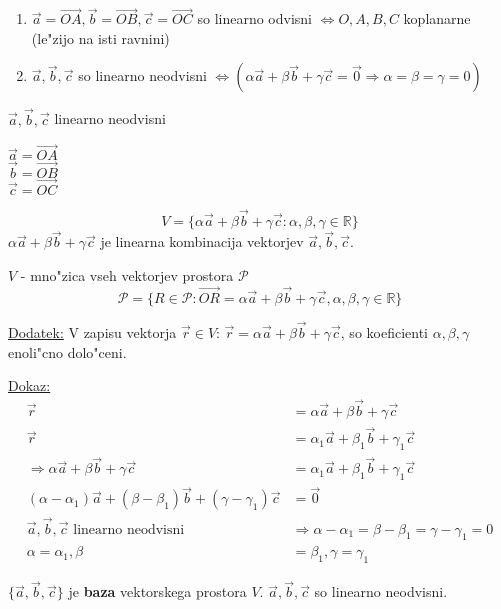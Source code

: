 \begin{enumerate}
	\item \(\vec{a} = \vec{OA}, \vec{b} = \vec{OB}, \vec{c} = \vec{OC}\) so linearno odvisni \(\Leftrightarrow O, A, B, C\) koplanarne (le"zijo na isti ravnini)
	\item \(\vec{a}, \vec{b}, \vec{c}\) so linearno neodvisni \(\Leftrightarrow (\alpha \vec{a} + \beta \vec{b} + \gamma \vec{c} = \vec{0} \Rightarrow \alpha = \beta = \gamma = 0)\)
\end{enumerate}

\(\vec{a}, \vec{b}, \vec{c}\) linearno neodvisni

\(\vec{a} = \vec{OA}\)\\
\(\vec{b} = \vec{OB}\)\\
\(\vec{c} = \vec{OC}\)

\[V = \{\alpha \vec{a} + \beta \vec{b} + \gamma \vec{c}: \alpha, \beta, \gamma \in \mathbb{R}\}\]
\(\alpha \vec{a} + \beta \vec{b} + \gamma \vec{c}\) je linearna kombinacija vektorjev \(\vec{a}, \vec{b}, \vec{c}\).

\(V\) - mno"zica vseh vektorjev prostora \(\mathcal{P}\)
\[\mathcal{P} = \{R \in \mathcal{P}: \vec{OR} = \alpha \vec{a} + \beta \vec{b} + \gamma \vec{c}, \alpha, \beta, \gamma \in \mathbb{R}\}\]

\underline{Dodatek:} V zapisu vektorja \(\vec{r} \in V\): \(\vec{r} = \alpha \vec{a} + \beta \vec{b} + \gamma \vec{c}\), so koeficienti \(\alpha, \beta, \gamma\) enoli"cno dolo"ceni.

\underline{Dokaz:}
\begin{align*}
	\vec{r} &= \alpha \vec{a} + \beta \vec{b} + \gamma \vec{c}\\
	\vec{r} &= \alpha_1 \vec{a} + \beta_1 \vec{b} + \gamma_1 \vec{c}\\
	\Rightarrow \alpha \vec{a} + \beta \vec{b} + \gamma \vec{c} &= \alpha_1 \vec{a} + \beta_1 \vec{b} + \gamma_1 \vec{c}\\
	(\alpha - \alpha_1)\vec{a} + (\beta - \beta_1)\vec{b} + (\gamma - \gamma_1)\vec{c} &= \vec{0}\\
	\vec{a}, \vec{b}, \vec{c} \text{ linearno neodvisni } &\Rightarrow \alpha - \alpha_1 = \beta - \beta_1 = \gamma - \gamma_1 = 0\\
	\alpha = \alpha_1, \beta &= \beta_1, \gamma = \gamma_1
\end{align*}

\(\{\vec{a}, \vec{b}, \vec{c}\}\) je \textbf{baza} vektorskega prostora \(V\). \(\vec{a}, \vec{b}, \vec{c}\) so linearno neodvisni.

